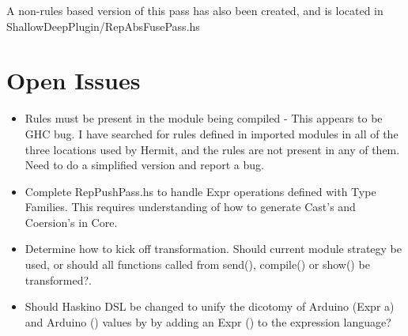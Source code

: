 \documentclass[11pt, oneside]{article}   	%
\begin{document}
A non-rules based version of this pass has also been created, and is
located in ShallowDeepPlugin/RepAbsFusePass.hs

\section{Open Issues}

\begin{itemize}
  \item Rules must be present in the module being compiled - This appears to be 
  GHC bug.  I have searched for rules defined in imported modules in all of the
  three locations used by Hermit, and the rules are not present in any of them. 
  Need to do a simplified version and report a bug.
  \item Complete RepPushPass.hs to handle Expr operations defined with
  Type Families.  This requires understanding of how to generate Cast's and
  Coersion's in Core.
  \item Determine how to kick off transformation.  Should current module 
  strategy be used, or should all functions called from send(), compile() or
  show() be transformed?.
  \item Should Haskino DSL be changed to unify the dicotomy of Arduino (Expr a)
  and Arduino () values by by adding an Expr () to the expression language?
\end{itemize}
\end{document}
